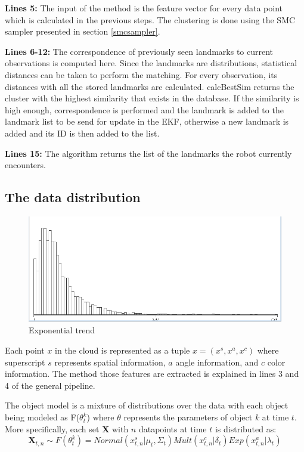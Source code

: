 \documentclass[twoside,hidelinks]{article}
\begin{document}
\textbf{Lines 5:} The input of the method is the feature vector for every data point which is calculated in the previous steps. The clustering is done using the SMC sampler presented in section \ref{smcsampler}. 

\textbf{Lines 6-12:} The correspondence of previously seen landmarks to current observations is computed here. Since the landmarks are distributions, statistical distances can be taken to perform the matching. For every observation, its distances with all the stored landmarks are calculated. calcBestSim returns the cluster with the highest similarity that exists in the database. If the similarity is high enough, correspondence is performed and the landmark is added to the landmark list to be send for update in the EKF, otherwise a new landmark is added and its ID is then added to the list.

\textbf{Lines 15:} The algorithm returns the list of the landmarks the robot currently encounters.

\subsection{The data distribution}
\label{data:dist}

\begin{figure}
    \centering
    \includegraphics[width=.35\textwidth]{Kullback-Leibler}
    \caption{Exponential trend}
    \label{pcl:kl}
\end{figure}

Each point $x$ in the cloud is represented as a tuple $x =(x^s, x^a, x^c ) $ where superscript $s$ represents spatial information, $a$ angle information, and $c$ color information. The method those features are extracted is explained in lines 3 and 4 of the general pipeline.

The object model is a mixture of distributions over the data with each object being modeled as F($\theta_t^k$) where $\theta$ represents the parameters of object $k$ at time $t$. More specifically, each set \textbf{X} with $n$ datapoints at time $t$ is distributed as:
$$ \textbf{X}_{t,n} \sim F(\theta_t^k) = Normal(x_{t,n}^s| \mu_t, \Sigma_t) Mult(x_{t,n}^c | \delta_t) Exp(x_{t,n}^a | \lambda_t) $$
\end{document}
